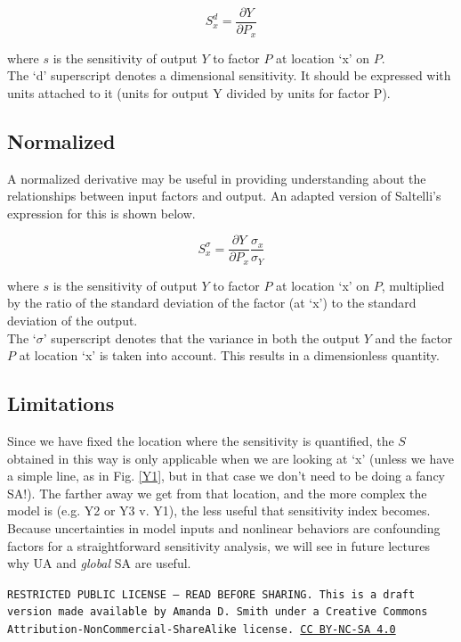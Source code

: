 \documentclass[10pt]{article}
\begin{document}
$$ S_x^d =  \frac{\partial Y}{\partial P_x} $$

where $s$ is the sensitivity of output $Y$ to factor $P$ at location `x' on $P$.\\
The `d' superscript denotes a dimensional sensitivity. It should be expressed with units attached to it (units for output Y divided by units for factor P).

\subsection{Normalized}

A normalized derivative may be useful in providing understanding about the relationships between input factors and output. An adapted version of Saltelli's expression \cite{Saltelli2008-zc} for this is shown below.

$$ S_x^\sigma =  \frac{\partial Y}{\partial P_x} \frac{\sigma_x}{\sigma_Y} $$

where $s$ is the sensitivity of output $Y$ to factor $P$ at location `x' on $P$, multiplied by the ratio of the standard deviation of the factor (at `x') to the standard deviation of the output.\\ 
The `$\sigma$' superscript denotes that the variance in both the output $Y$ and the factor $P$ at location `x' is taken into account. This results in a dimensionless quantity.

\subsection{Limitations} 

Since we have fixed the location where the sensitivity is quantified, the $S$ obtained in this way is only applicable when we are looking at `x' (unless we have a simple line, as in Fig. \ref{Y1}, but in that case we don't need to be doing a fancy SA!). The farther away we get from that location, and the more complex the model is (e.g. Y2 or Y3 v. Y1), the less useful that sensitivity index becomes. Because uncertainties in model inputs and nonlinear behaviors are confounding factors for a straightforward sensitivity analysis, we will see in future lectures why UA and \textit{global} SA are useful. 

\medskip

\noindent
\texttt{\footnotesize RESTRICTED PUBLIC LICENSE --- READ BEFORE SHARING. This is a draft version made available by Amanda D. Smith under a Creative Commons Attribution-NonCommercial-ShareAlike license. 
\href{https://creativecommons.org/licenses/by-nc-sa/4.0/}{CC BY-NC-SA 4.0}}

\printbibliography
\end{document}
